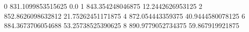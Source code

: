 0 831.1099853515625 0.0
1 843.354248046875 12.2442626953125
2 852.8626098632812 21.75262451171875
4 872.054443359375 40.9444580078125
6 884.3673706054688 53.25738525390625
8 890.9779052734375 59.867919921875

